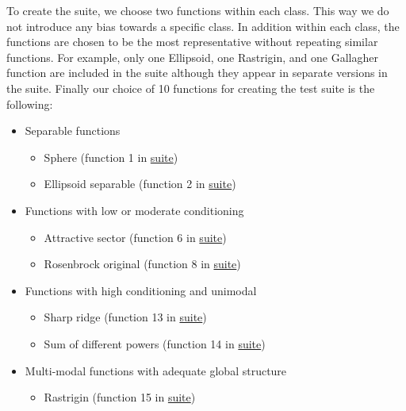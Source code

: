 \documentclass[letterpaper,12pt,english]{article}
\begin{document}
To create the  suite, we choose two functions within each class. This way we do not introduce any bias towards a specific class. In addition within each class, the functions are chosen to be the most
representative without repeating similar functions. For example,
only one Ellipsoid, one Rastrigin, and one Gallagher function are
included in the  suite although they appear in
separate versions in the  suite. Finally our choice of  10  functions for creating the  test suite is the following:
\begin{itemize}
\item {} 
Separable functions
\begin{itemize}
\item {} 
Sphere (function 1 in \href{https://hal.inria.fr/inria-00362633}{ suite})

\item {} 
Ellipsoid separable (function 2 in \href{https://hal.inria.fr/inria-00362633}{ suite})

\end{itemize}

\item {} 
Functions with low or moderate conditioning
\begin{itemize}
\item {} 
Attractive sector (function 6 in \href{https://hal.inria.fr/inria-00362633}{ suite})

\item {} 
Rosenbrock original (function 8 in \href{https://hal.inria.fr/inria-00362633}{ suite})

\end{itemize}

\item {} 
Functions with high conditioning and unimodal
\begin{itemize}
\item {} 
Sharp ridge (function 13 in \href{https://hal.inria.fr/inria-00362633}{ suite})

\item {} 
Sum of different powers (function 14 in \href{https://hal.inria.fr/inria-00362633}{ suite})

\end{itemize}

\item {} 
Multi-modal functions with adequate global structure
\begin{itemize}
\item {} 
Rastrigin (function 15 in \href{https://hal.inria.fr/inria-00362633}{ suite})


\end{itemize}
\end{itemize}
\end{document}
